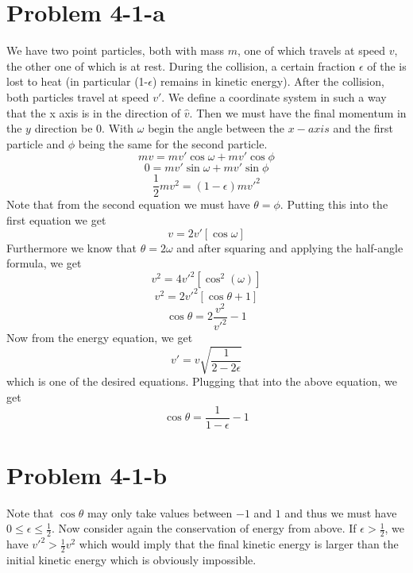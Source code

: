 
\section*{Problem 4-1-a}
We have two point particles, both with mass $m$, one of which travels at speed $v$, the other one of which is at rest. During the collision, a certain fraction $\epsilon$ of the is lost to heat (in particular (1-$\epsilon$) remains in kinetic energy). After the collision, both particles travel at speed $v'$. We define a coordinate system in such a way that the x axis is in the direction of $\hat{v}$. Then we must have the final momentum in the $y$ direction be 0. With $\omega$ begin the angle between the $x-axis$ and the first particle and $\phi$ being the same for the second particle.
\[ mv = mv' \cos \omega+ mv' \cos \phi \]
\[ 0 = mv' \sin \omega+ mv' \sin \phi \]
\[ \frac{1}{2} m v^2 = (1-\epsilon)m v'^2 \]
Note that from the second equation we must have $\theta=\phi$. Putting this into the first equation we get
\[ v=2v'[\cos\omega] \]
Furthermore we know that $\theta = 2\omega$ and after squaring and applying the half-angle formula, we get  
\[ v^2=4v'^2[\cos^2(\omega)] \]
\[ v^2=2v'^2[\cos\theta + 1]\]
\[\cos\theta = 2\frac{v^2}{v'^2} - 1 \]
Now from the energy equation, we get
\[ v' = v \sqrt{\frac{1}{2-2\epsilon}} \]
which is one of the desired equations. Plugging that into the above equation, we get
\[ \cos\theta = \frac{1}{1-\epsilon} -1 \]
\section*{Problem 4-1-b}
Note that $\cos \theta$ may only take values between $-1$ and $1$ and thus we must have $0\leq \epsilon \leq \frac{1}{2}$. Now consider again the conservation of energy from above. If $\epsilon>\frac{1}{2}$, we have $v'^2>\frac{1}{2}v^2$  which would imply that the final kinetic energy is larger than the initial kinetic energy which is obviously impossible. 
